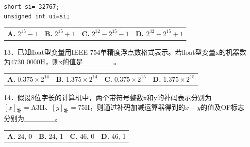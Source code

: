 \documentclass[UTF8,11pt]{ctexart}
\begin{document}
\begin{Verbatim}[breaklines,breakanywhere,fontsize=\small]
short si=-32767;
unsigned int ui=si;
\end{Verbatim}

\begin{center}\begin{tabular}{>{\raggedright\arraybackslash}p{\dimexpr(\linewidth-8\tabcolsep)/4\relax}>{\raggedright\arraybackslash}p{\dimexpr(\linewidth-8\tabcolsep)/4\relax}>{\raggedright\arraybackslash}p{\dimexpr(\linewidth-8\tabcolsep)/4\relax}>{\raggedright\arraybackslash}p{\dimexpr(\linewidth-8\tabcolsep)/4\relax}}
\textbf{A.} \(\displaystyle 2^{15}-1\) & \textbf{B.} \(\displaystyle 2^{15}+1\) & \textbf{C.} \(\displaystyle 2^{32}-2^{15}-1\) & \textbf{D.} \(\displaystyle 2^{32}-2^{15}+1\)\\[.35em]\end{tabular}\end{center}

13．已知float型变量用IEEE 754单精度浮点数格式表示。若float型变量x的机器数为4730 0000H，则x的值是\_\_\_\_\_\_。


\begin{center}\begin{tabular}{>{\raggedright\arraybackslash}p{\dimexpr(\linewidth-8\tabcolsep)/4\relax}>{\raggedright\arraybackslash}p{\dimexpr(\linewidth-8\tabcolsep)/4\relax}>{\raggedright\arraybackslash}p{\dimexpr(\linewidth-8\tabcolsep)/4\relax}>{\raggedright\arraybackslash}p{\dimexpr(\linewidth-8\tabcolsep)/4\relax}}
\textbf{A.} \(\displaystyle 0.375\times2^{14}\) & \textbf{B.} \(\displaystyle 1.375\times2^{14}\) & \textbf{C.} \(\displaystyle 0.375\times2^{15}\) & \textbf{D.} \(\displaystyle 1.375\times2^{15}\)\\[.35em]\end{tabular}\end{center}

14．假设8位字长的计算机中，两个带符号整数x和y的补码表示分别为\(\displaystyle [x]_{\text{补}}=\mathrm{A3H}\)、\(\displaystyle [y]_{\text{补}}=\mathrm{75H}\)，则通过补码加减运算器得到的\(\displaystyle x-y\)的值及OF标志分别为\_\_\_\_\_\_。


\begin{center}\begin{tabular}{>{\raggedright\arraybackslash}p{\dimexpr(\linewidth-8\tabcolsep)/4\relax}>{\raggedright\arraybackslash}p{\dimexpr(\linewidth-8\tabcolsep)/4\relax}>{\raggedright\arraybackslash}p{\dimexpr(\linewidth-8\tabcolsep)/4\relax}>{\raggedright\arraybackslash}p{\dimexpr(\linewidth-8\tabcolsep)/4\relax}}
\textbf{A.} 24, 0 & \textbf{B.} 24, 1 & \textbf{C.} 46, 0 & \textbf{D.} 46, 1\\[.35em]\end{tabular}\end{center}
\end{document}
